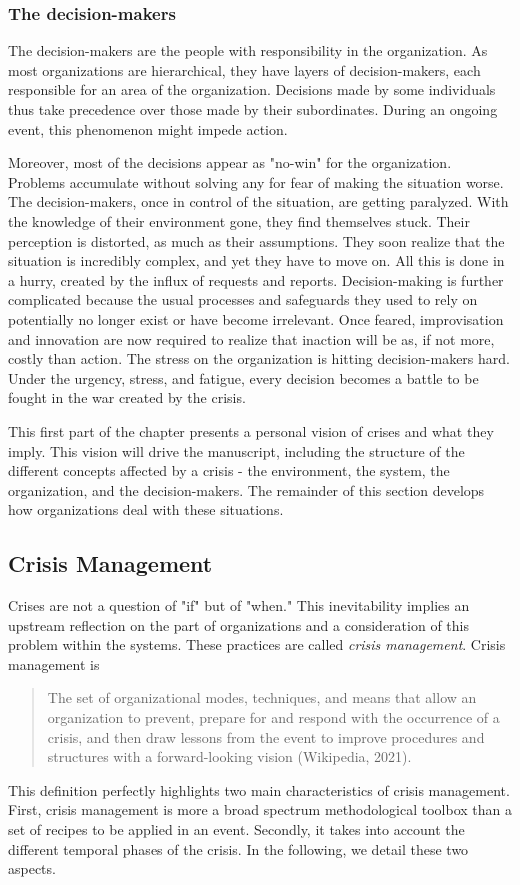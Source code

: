\subsubsection{The decision-makers}
The decision-makers are the people with responsibility in the organization.
As most organizations are hierarchical, they have layers of decision-makers, each responsible for an area of the organization.
Decisions made by some individuals thus take precedence over those made by their subordinates.
During an ongoing event, this phenomenon might impede action.

Moreover, most of the decisions appear as "no-win" for the organization.
Problems accumulate without solving any for fear of making the situation worse.
The decision-makers, once in control of the situation, are getting paralyzed.
With the knowledge of their environment gone, they find themselves stuck.
Their perception is distorted, as much as their assumptions.
They soon realize that the situation is incredibly complex, and yet they have to move on.
All this is done in a hurry, created by the influx of requests and reports.
Decision-making is further complicated because the usual processes and safeguards they used to rely on potentially no longer exist or have become irrelevant.
Once feared, improvisation and innovation are now required to realize that inaction will be as, if not more, costly than action.
The stress on the organization is hitting decision-makers hard.
Under the urgency, stress, and fatigue, every decision becomes a battle to be fought in the war created by the crisis.

This first part of the chapter presents a personal vision of crises and what they imply.
This vision will drive the manuscript, including the structure of the different concepts affected by a crisis - the environment, the system, the organization, and the decision-makers.
The remainder of this section develops how organizations deal with these situations.

\subsection{Crisis Management}
Crises are not a question of "if" but of "when."
This inevitability implies an upstream reflection on the part of organizations and a consideration of this problem within the systems.
These practices are called \emph{crisis management}.
Crisis management is
\blockquote{The set of organizational modes, techniques, and means that allow an organization to prevent,
    prepare for and respond with the occurrence of a crisis, and then draw lessons from the event to improve procedures and structures
    with a forward-looking vision (Wikipedia, 2021).}
This definition perfectly highlights two main characteristics of crisis management.
First, crisis management is more a broad spectrum methodological toolbox than a set of recipes to be applied in an event.
Secondly, it takes into account the different temporal phases of the crisis.
In the following, we detail these two aspects.

